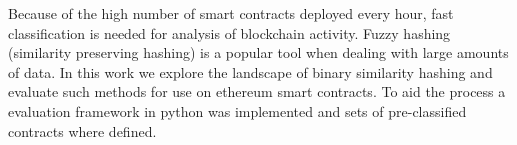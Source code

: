 \documentclass[../main.tex]{subfiles}
\begin{document}
Because of the high number of smart contracts deployed every hour, fast classification is needed for analysis of blockchain activity.
Fuzzy hashing (similarity preserving hashing) is a popular tool when dealing with large amounts of data.
In this work we explore the landscape of binary similarity hashing and evaluate such methods for use on ethereum smart contracts.
To aid the process a evaluation framework in python was implemented and sets of pre-classified contracts where defined.
\end{document}

